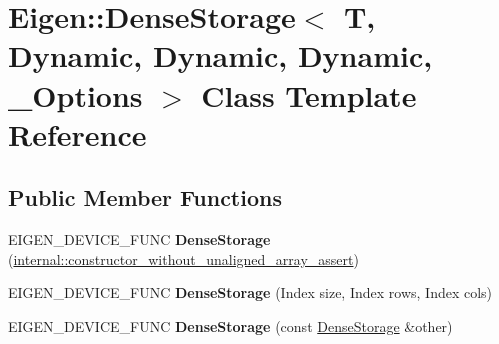 \hypertarget{class_eigen_1_1_dense_storage_3_01_t_00_01_dynamic_00_01_dynamic_00_01_dynamic_00_01___options_01_4}{}\section{Eigen\+::Dense\+Storage$<$ T, Dynamic, Dynamic, Dynamic, \+\_\+\+Options $>$ Class Template Reference}
\label{class_eigen_1_1_dense_storage_3_01_t_00_01_dynamic_00_01_dynamic_00_01_dynamic_00_01___options_01_4}
\subsection*{Public Member Functions}
\begin{DoxyCompactItemize}
\item 
\mbox{\label{class_eigen_1_1_dense_storage_3_01_t_00_01_dynamic_00_01_dynamic_00_01_dynamic_00_01___options_01_4_a65d66d01952f95ac059f20b8974378c6}} 
E\+I\+G\+E\+N\+\_\+\+D\+E\+V\+I\+C\+E\+\_\+\+F\+U\+NC {\bfseries Dense\+Storage} (\mbox{\hyperlink{struct_eigen_1_1internal_1_1constructor__without__unaligned__array__assert}{internal\+::constructor\+\_\+without\+\_\+unaligned\+\_\+array\+\_\+assert}})
\item 
\mbox{\label{class_eigen_1_1_dense_storage_3_01_t_00_01_dynamic_00_01_dynamic_00_01_dynamic_00_01___options_01_4_acd19e89326bfd06b23955737a831993e}} 
E\+I\+G\+E\+N\+\_\+\+D\+E\+V\+I\+C\+E\+\_\+\+F\+U\+NC {\bfseries Dense\+Storage} (Index size, Index rows, Index cols)
\item 
\mbox{\label{class_eigen_1_1_dense_storage_3_01_t_00_01_dynamic_00_01_dynamic_00_01_dynamic_00_01___options_01_4_a5a73c9106cf39870aa08350c6acbce67}} 
E\+I\+G\+E\+N\+\_\+\+D\+E\+V\+I\+C\+E\+\_\+\+F\+U\+NC {\bfseries Dense\+Storage} (const \mbox{\hyperlink{class_eigen_1_1_dense_storage}{Dense\+Storage}} \&other)
\item 
\mbox{\label{class_eigen_1_1_dense_storage_3_01_t_00_01_dynamic_00_01_dynamic_00_01_dynamic_00_01___options_01_4_a2f7e80c5ee410e37f47cd361ed4cfbaa}} 

\end{DoxyCompactItemize}
